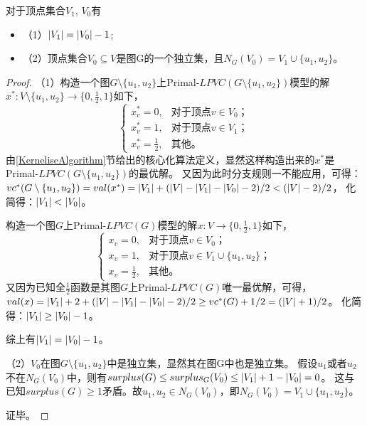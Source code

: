 \begin{claim}
对于顶点集合$V_1$, $V_0$有
\begin{itemize}
  \item{（1）}$\left\vert V_1 \right\vert = \left\vert V_0 \right\vert - 1$;
  \item{（2）}顶点集合$V_0 \subseteq V$是图G的一个独立集，且$N_G(V_0) = V_1 \cup \{u_1, u_2\}$。
\end{itemize}
\end{claim}
\begin{proof}
（1）构造一个图$G\setminus\{u_1, u_2\}$上Primal-$LPVC(G\setminus\{u_1, u_2\})$模型的解$x^* : V \setminus \{u_1, u_2\} \rightarrow \{0, \frac{1}{2}, 1\}$如下，
\begin{equation*}
   \begin{cases}
            x^*_v =0, & \mbox{对于顶点$v \in V_0$；}  \\
            x^*_v =1, & \mbox{对于顶点$v \in V_1$；}  \\
            x^*_v =\frac{1}{2}, & \mbox{其他。}
          \end{cases}
\end{equation*}
由\ref{KerneliseAlgorithm}节给出的核心化算法定义，显然这样构造出来的$x^*$是Primal-$LPVC(G\setminus\{u_1, u_2\})$的最优解。
又因为此时分支规则一不能应用，可得：
$vc^*(G\setminus\{u_1, u_2\}) = val(x^*) = \left\vert V_1 \right\vert + (\left\vert V \right\vert - \left\vert V_1 \right\vert - \left\vert V_0 \right\vert - 2) / 2 < (\left\vert V \right\vert - 2) / 2$，
化简得：$\left\vert V_1 \right\vert < \left\vert V_0 \right\vert$。

构造一个图$G$上Primal-$LPVC(G)$模型的解$x : V \rightarrow \{0, \frac{1}{2}, 1\}$如下，
\begin{equation*}
   \begin{cases}
            x_v =0, & \mbox{对于顶点$v \in V_0$；}  \\
            x_v =1, & \mbox{对于顶点$v \in V_1 \cup \{u_1, u_2\}$；}  \\
            x_v =\frac{1}{2}, & \mbox{其他。}
          \end{cases}
\end{equation*}
又因为已知全$\frac{1}{2}$函数是其图$G$上Primal-$LPVC(G)$唯一最优解，可得，
$val(x) = \left\vert V_1 \right\vert + 2 + (\left\vert V \right\vert - \left\vert V_1 \right\vert - \left\vert V_0 \right\vert - 2) / 2 \ge vc^*(G) + 1/2 = (\left\vert V \right\vert + 1) / 2$。
化简得：$\left\vert V_1 \right\vert \ge \left\vert V_0 \right\vert - 1$。

综上有$\left\vert V_1 \right\vert = \left\vert V_0 \right\vert - 1$。

（2）$V_0$在图$G\setminus\{u_1, u_2\}$中是独立集，显然其在图G中也是独立集。
假设$u_1$或者$u_2$不在$N_G(V_0)$中，则有$surplus(G) \le surplus_G(V_0) \le \left\vert V_1 \right\vert + 1 - \left\vert V_0 \right\vert = 0$。
这与已知$surplus(G) \ge 1$矛盾。故$u_1,u_2 \in N_G(V_0)$，即$N_G(V_0) = V_1 \cup \{u_1, u_2\}$。

证毕。
\end{proof}

